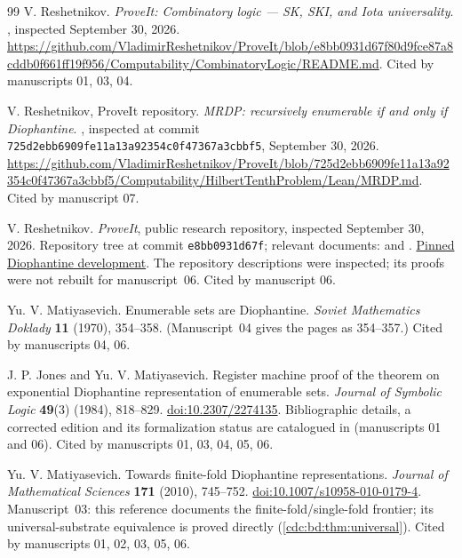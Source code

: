 \documentclass[11pt,a4paper]{article}
\theoremstyle{definition}
\theoremstyle{remark}
\begin{document}
\begin{thebibliography}{99}
V. Reshetnikov.
\emph{ProveIt: Combinatory logic --- SK, SKI, and Iota universality}.
, inspected September 30, 2026.
\url{https://github.com/VladimirReshetnikov/ProveIt/blob/e8bb0931d67f80d9fce87a8cddb0f661ff19f956/Computability/CombinatoryLogic/README.md}.
Cited by manuscripts 01, 03, 04.

V. Reshetnikov, ProveIt repository.
\emph{MRDP: recursively enumerable if and only if Diophantine}.
, inspected at commit \texttt{725d2ebb6909fe11a13a92354c0f47367a3cbbf5}, September 30, 2026.
\url{https://github.com/VladimirReshetnikov/ProveIt/blob/725d2ebb6909fe11a13a92354c0f47367a3cbbf5/Computability/HilbertTenthProblem/Lean/MRDP.md}.
Cited by manuscript 07.

V. Reshetnikov.
\emph{ProveIt}, public research repository, inspected September 30, 2026.
Repository tree at commit \texttt{e8bb0931d67f}; relevant documents:  and .
\href{https://github.com/VladimirReshetnikov/ProveIt/tree/e8bb0931d67f80d9fce87a8cddb0f661ff19f956/Computability/HilbertTenthProblem}{Pinned Diophantine development}.
The repository descriptions were inspected; its proofs were not rebuilt for manuscript~06.
Cited by manuscript 06.

Yu. V. Matiyasevich.
Enumerable sets are Diophantine.
\emph{Soviet Mathematics Doklady} \textbf{11} (1970), 354--358.
(Manuscript~04 gives the pages as 354--357.)
Cited by manuscripts 04, 06.

J. P. Jones and Yu. V. Matiyasevich.
Register machine proof of the theorem on exponential Diophantine representation of enumerable sets.
\emph{Journal of Symbolic Logic} \textbf{49}(3) (1984), 818--829.
\href{https://doi.org/10.2307/2274135}{doi:10.2307/2274135}.
Bibliographic details, a corrected edition and its formalization status are catalogued in \cite{repo-h10} (manuscripts 01 and 06).
Cited by manuscripts 01, 03, 04, 05, 06.

Yu. V. Matiyasevich.
Towards finite-fold Diophantine representations.
\emph{Journal of Mathematical Sciences} \textbf{171} (2010), 745--752.
\href{https://doi.org/10.1007/s10958-010-0179-4}{doi:10.1007/s10958-010-0179-4}.
Manuscript~03: this reference documents the finite-fold/single-fold frontier; its universal-substrate equivalence is proved directly (\cref{cdc:bd:thm:universal}).
Cited by manuscripts 01, 02, 03, 05, 06.


\end{thebibliography}
\end{document}
